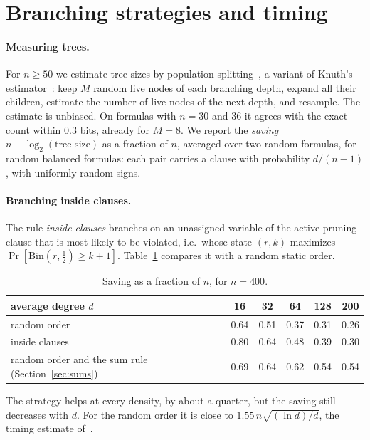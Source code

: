 \documentclass[11pt,a4paper]{article}
\theoremstyle{remark}
\begin{document}
\section{Branching strategies and timing}\label{sec:strategies}

\paragraph{Measuring trees.} For $n\ge50$ we estimate tree sizes by
population splitting~\cite{AV94}, a variant of Knuth's estimator~\cite{Knu75}:
keep $M$ random live nodes of each branching depth, expand all their children,
estimate the number of live nodes of the next depth, and resample. The
estimate is unbiased. On formulas with $n=30$ and $36$ it agrees with the exact
count within $0.3$ bits, already for $M=8$. We report the \emph{saving}
$n-\log_2(\text{tree size})$ as a fraction of $n$, averaged over two random
formulas, for random balanced formulas: each pair carries a clause with
probability $d/(n-1)$, with uniformly random signs.

\paragraph{Branching inside clauses.} The rule \emph{inside clauses} branches
on an unassigned variable of the active pruning clause that is most likely to
be violated, i.e.\ whose state $(r,k)$ maximizes $\Pr[\mathrm{Bin}(r,\frac12)
\ge k+1]$. Table~\ref{tab:strategies} compares it with a random static order.

\begin{table}[ht]
\centering
\begin{tabular}{lccccc}
\toprule
average degree $d$ & 16 & 32 & 64 & 128 & 200\\
\midrule
random order & 0.64 & 0.51 & 0.37 & 0.31 & 0.26\\
inside clauses & 0.80 & 0.64 & 0.48 & 0.39 & 0.30\\
random order and the sum rule (Section~\ref{sec:sums}) & 0.69 & 0.64 & 0.62
 & 0.54 & 0.54\\
\bottomrule
\end{tabular}
\caption{Saving as a fraction of $n$, for $n=400$.}\label{tab:strategies}
\end{table}

The strategy helps at every density, by about a quarter, but the saving still
decreases with $d$. For the random order it is close to
$1.55\,n\sqrt{(\ln d)/d}$, the timing estimate of~\cite[Remark~29]{N3}.
\end{document}
